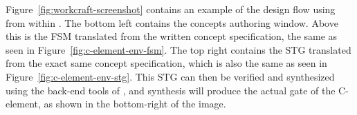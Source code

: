 Figure~\ref{fig:workcraft-screenshot} contains an example of the design flow using  from 
within . The bottom left contains the concepts authoring window. 
Above this is the FSM translated from 
the written concept specification, the same as seen in Figure~\ref{fig:c-element-env-fsm}. The top right 
contains the STG translated from the exact same concept specification, which is also the same as seen 
in Figure~\ref{fig:c-element-env-stg}. This STG can then be verified and synthesized using the back-end 
tools of , and synthesis will produce the actual gate of the C-element, as shown in the 
bottom-right of the image. 

